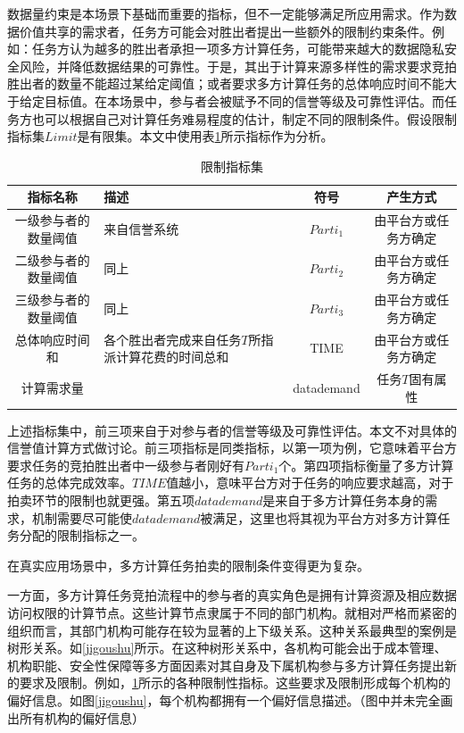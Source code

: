 \documentclass[promaster]{thesis-uestc}
\begin{document}
数据量约束是本场景下基础而重要的指标，但不一定能够满足所应用需求。作为数据价值共享的需求者，任务方可能会对胜出者提出一些额外的限制约束条件。例如：任务方认为越多的胜出者承担一项多方计算任务，可能带来越大的数据隐私安全风险，并降低数据结果的可靠性。于是，其出于计算来源多样性的需求要求竞拍胜出者的数量不能超过某给定阈值；或者要求多方计算任务的总体响应时间不能大于给定目标值。在本场景中，参与者会被赋予不同的信誉等级及可靠性评估。而任务方也可以根据自己对计算任务难易程度的估计，制定不同的限制条件。假设限制指标集$Limit$是有限集。本文中使用表\ref{zhibiao}所示指标作为分析。

\begin{table}[h]
\caption{限制指标集}
\label{zhibiao}
\begin{tabular}{cp{10em}cc}
    \toprule
    指标名称& 描述&符号&产生方式\\
    \midrule
    一级参与者的数量阈值&来自信誉系统&$Parti_1$&由平台方或任务方确定\\
    二级参与者的数量阈值& 同上&$Parti_2$&由平台方或任务方确定\\
    三级参与者的数量阈值& 同上&$Parti_3$&由平台方或任务方确定\\
    总体响应时间和&各个胜出者完成来自任务$T$所指派计算花费的时间总和&TIME&由平台方或任务方确定\\
    计算需求量&&datademand&任务$T$固有属性\\
    \bottomrule
\end{tabular}
\end{table}

上述指标集中，前三项来自于对参与者的信誉等级及可靠性评估。本文不对具体的信誉值计算方式做讨论。前三项指标是同类指标，以第一项为例，它意味着平台方要求任务的竞拍胜出者中一级参与者刚好有$Parti_1$个。第四项指标衡量了多方计算任务的总体完成效率。$TIME$值越小，意味平台方对于任务的响应要求越高，对于拍卖环节的限制也就更强。第五项$datademand$是来自于多方计算任务本身的需求，机制需要尽可能使$datademand$被满足，这里也将其视为平台方对多方计算任务分配的限制指标之一。

在真实应用场景中，多方计算任务拍卖的限制条件变得更为复杂。

一方面，多方计算任务竞拍流程中的参与者的真实角色是拥有计算资源及相应数据访问权限的计算节点。这些计算节点隶属于不同的部门机构。就相对严格而紧密的组织而言，其部门机构可能存在较为显著的上下级关系。这种关系最典型的案例是树形关系。如\ref{jigoushu}所示。在这种树形关系中，各机构可能会出于成本管理、机构职能、安全性保障等多方面因素对其自身及下属机构参与多方计算任务提出新的要求及限制。例如，\ref{zhibiao}所示的各种限制性指标。这些要求及限制形成每个机构的偏好信息。如图\ref{jigoushu}，每个机构都拥有一个偏好信息描述。（图中并未完全画出所有机构的偏好信息）
\end{document}
